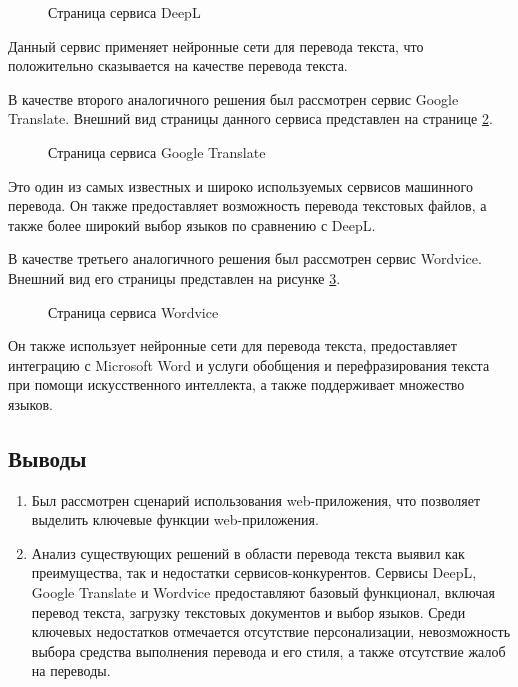 \documentclass[14pt]{extarticle}
\newcommand{\borderedimage}[3][1\linewidth]{%
  \ifthenelse{\equal{#3}{yes}}{%
    \fbox{\texttt{[image: \#2]}}%
  }{%
    \texttt{[image: \#2]}%
  }%
}
\begin{document}
\begin{figure}[H]
    \centering
    \borderedimage[0.9\linewidth]{img/analog-1.jpg}{yes}
    \caption{Страница сервиса DeepL \label{img:deepl}}
\end{figure}
Данный сервис применяет нейронные сети для перевода текста, что положительно сказывается на качестве перевода текста.

В качестве второго аналогичного решения был рассмотрен сервис Google Translate. Внешний вид страницы данного сервиса представлен на странице \ref{img:gtranslate}.

\begin{figure}[H]
    \centering
    \borderedimage[0.85\linewidth]{img/analog-2.jpg}{yes}
    \caption{Страница сервиса Google Translate \label{img:gtranslate}}
\end{figure}
Это один из самых известных и широко используемых сервисов машинного перевода. Он также предоставляет возможность перевода текстовых файлов, а также более широкий выбор языков по сравнению с DeepL.

В качестве третьего аналогичного решения был рассмотрен сервис Wordvice. Внешний вид его страницы представлен на рисунке \ref{img:wordvice}.

\begin{figure}[H]
    \centering
    \borderedimage[0.9\linewidth]{img/analog-3.jpg}{yes}
    \caption{Страница сервиса Wordvice \label{img:wordvice}}
\end{figure}

Он также использует нейронные сети для перевода текста, предоставляет интеграцию с Microsoft Word и услуги обобщения и перефразирования текста при помощи искусственного интеллекта, а также поддерживает множество языков.

\subsection{Выводы}

\begin{enumerate}
    \item Был рассмотрен сценарий использования web-приложения, что позволяет выделить ключевые функции web-приложения.
    \item Анализ существующих решений в области перевода текста выявил как преимущества, так и недостатки сервисов-конкурентов. Сервисы DeepL, Google Translate и Wordvice предоставляют базовый функционал, включая перевод текста, загрузку текстовых документов и выбор языков. Среди ключевых недостатков отмечается отсутствие персонализации, невозможность выбора средства выполнения перевода и его стиля, а также отсутствие жалоб на переводы.
\end{enumerate}
\end{document}
